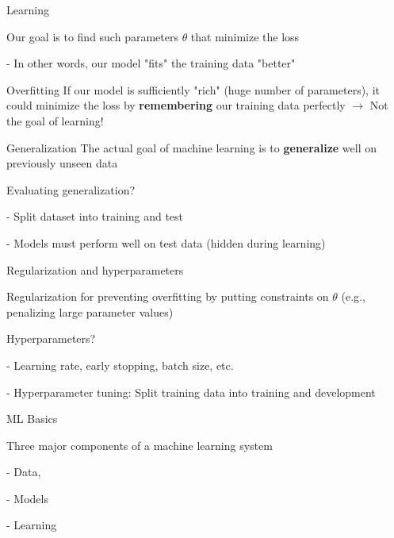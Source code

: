 \documentclass[12pt]{beamer}
\begin{document}
\begin{frame}{Learning}
	
Our goal is to find such parameters $\theta$ that minimize the loss

- In other words, our model "fits" the training data "better"


\begin{block}{Overfitting}
If our model is sufficiently "rich" (huge number of parameters), it could minimize the loss by \textbf{remembering} our training data perfectly $\to$ Not the goal of learning!
\end{block}

	
\end{frame}


\begin{frame}{Generalization}
The actual goal of machine learning is to \textbf{generalize} well on previously unseen data

\bigskip

Evaluating generalization?

- Split dataset into training and test

- Models must perform well on test data (hidden during learning)

\end{frame}


\begin{frame}{Regularization and hyperparameters}

Regularization for preventing overfitting by putting constraints on $\theta$ (e.g., penalizing large parameter values)

\bigskip

Hyperparameters?

- Learning rate, early stopping, batch size, etc.

- Hyperparameter tuning: Split training data into training and development
	
\end{frame}


\begin{frame}{ML Basics}
	
Three major components of a machine learning system
	
- Data,

- Models

- Learning
	
	
\end{frame}
\end{document}
